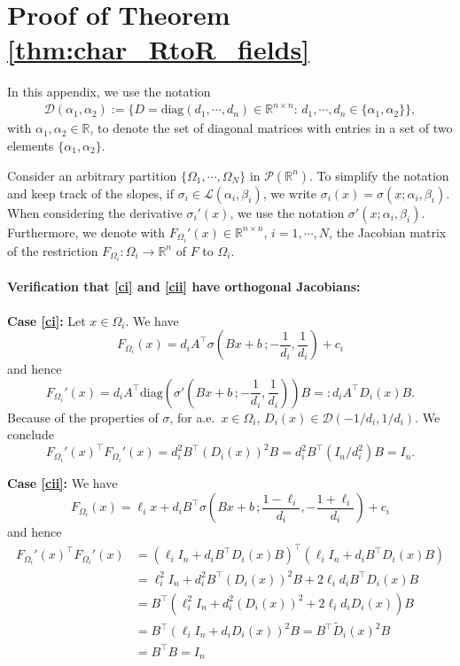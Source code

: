 \documentclass{article}
\theoremstyle{plain}
\theoremstyle{definition}
\theoremstyle{definition}
\theoremstyle{remark}
\theoremstyle{definition}
\theoremstyle{definition}
\theoremstyle{remark}
\numberwithin{equation}{section}
\begin{document}
\section{Proof of Theorem \ref{thm:char_RtoR_fields}}\label{app:proofThm1}
In this appendix, we use the notation 
\[
\begin{aligned}
\mathcal{D}(\alpha_1,\alpha_2):=\{D=\mathrm{diag}(d_1,\cdots,d_n)\in\mathbb{R}^{n\times n}:\,d_1,\cdots,d_n\in\{\alpha_1,\alpha_2\}\},
\end{aligned}
\]
with $\alpha_1,\alpha_2\in\mathbb{R}$, to denote the set of diagonal matrices with entries in a set of two elements $\{\alpha_1,\alpha_2\}$.

Consider an arbitrary partition $\{\Omega_1,\cdots,\Omega_N\}$ in $\mathcal{P}(\mathbb{R}^n)$. To simplify the notation and keep track of the slopes, if $\sigma_i\in\mathcal{L}(\alpha_i,\beta_i)$, we write $\sigma_i(x)=\sigma(x;\alpha_i,\beta_i)$.  When considering the derivative $\sigma_i'(x)$, we use the notation $\sigma'(x;\alpha_i,\beta_i)$. Furthermore, we denote with $F_{\Omega_i}'(x)\in\mathbb{R}^{n\times n}$, $i=1,\cdots,N$, the Jacobian matrix of the restriction $F_{\Omega_i}:\Omega_i\to\mathbb{R}^n$ of $F$ to $\Omega_i$. %
\paragraph{Verification that \ref{ci} and \ref{cii} have orthogonal Jacobians:} 
\textbf{Case \ref{ci}:} Let $x\in\Omega_i$. We have
\[
F_{\Omega_i}(x)=d_i A^\top \sigma\left(Bx + b\,;-\frac{1}{d_i},\frac{1}{d_i}\right) + c_i
\]
and hence
\[
F_{\Omega_i}'(x) = d_iA^\top \mathrm{diag}\left(\sigma'\left(Bx+b\,;-\frac{1}{d_i},\frac{1}{d_i}\right)\right)B=: d_iA^\top D_i(x) B.
\]
Because of the properties of $\sigma$, for a.e.\, $x\in\Omega_i$, $D_i(x)\in \mathcal{D}(-1/d_i,1/d_i)$. We conclude
\[
F_{\Omega_i}'(x)^\top F_{\Omega_i}'(x) = d_i^2 B^\top (D_i(x))^2 B= d_i^2 B^\top (I_n / d_i^2)B = I_n.
\]

\textbf{Case \ref{cii}:} We have
\[
F_{\Omega_i}(x)=\ell_ix + d_i B^\top \sigma\left(Bx + b\,;\frac{1-\ell_i}{d_i},-\frac{1+\ell_i}{d_i}\right) + c_i
\]
and hence
\[
\begin{split}
F_{\Omega_i}'(x)^\top F_{\Omega_i}'(x)& = (\ell_iI_n + d_iB^\top D_i(x)B)^\top (\ell_iI_n + d_iB^\top D_i(x)B) \\
&= \ell_i^2I_n + d^2_i B^\top (D_i(x))^2 B + 2\ell_id_iB^\top D_i(x)B\\
&=B^\top \left(\ell_i^2I_n + d^2_i (D_i(x))^2 + 2 \ell_id_iD_i(x)\right)B\\
&= B^\top \left(\ell_i I_n + d_i D_i(x)\right)^2B = B^\top \widetilde{D}_i(x)^2 B\\
& = B^\top B = I_n
\end{split}
\]
\end{document}
